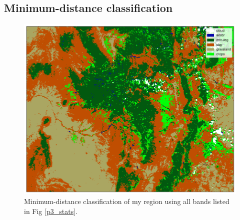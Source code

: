 \documentclass[12pt]{article}
\begin{document}
\clearpage

\subsection{Minimum-distance classification}

\begin{figure}[h!]
    \centering
    \includegraphics[width=.8\linewidth]{figures/p4/mdc_4+5.png}
    \caption{Minimum-distance classification of my region using all bands listed in Fig \ref{p3_stats}.}
    \label{p4_mdc}
\end{figure}
\end{document}
